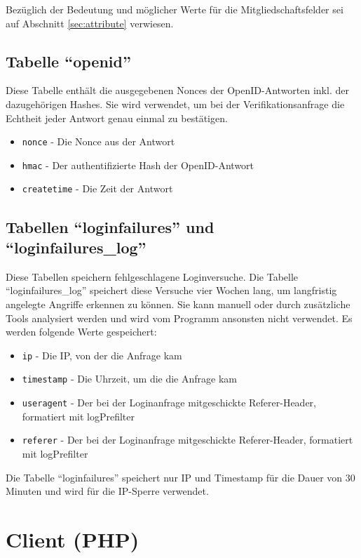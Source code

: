 \documentclass[parskip=half]{scrartcl}
\begin{document}
Bezüglich der Bedeutung und möglicher Werte für die Mitgliedschaftsfelder sei auf Abschnitt \ref{sec:attribute} verwiesen.

\subsection{Tabelle "`openid"'}
Diese Tabelle enthält die ausgegebenen Nonces der OpenID-Antworten inkl. der dazugehörigen Hashes.
Sie wird verwendet, um bei der Verifikationsanfrage die Echtheit jeder Antwort genau einmal zu bestätigen.
\begin{itemize}
	\item \texttt{nonce} - Die Nonce aus der Antwort
	\item \texttt{hmac} - Der authentifizierte Hash der OpenID-Antwort
	\item \texttt{createtime} - Die Zeit der Antwort
\end{itemize}

\subsection{Tabellen "`loginfailures"' und "`loginfailures\_log"'}
Diese Tabellen speichern fehlgeschlagene Loginversuche.
Die Tabelle "`loginfailures\_log"' speichert diese Versuche vier Wochen lang, um langfristig angelegte Angriffe erkennen zu können.
Sie kann manuell oder durch zusätzliche Tools analysiert werden und wird vom Programm ansonsten nicht verwendet.
Es werden folgende Werte gespeichert:
\begin{itemize}
	\item \texttt{ip} - Die IP, von der die Anfrage kam
	\item \texttt{timestamp} - Die Uhrzeit, um die die Anfrage kam
	\item \texttt{useragent} - Der bei der Loginanfrage mitgeschickte Referer-Header, formatiert mit logPrefilter
	\item \texttt{referer} - Der bei der Loginanfrage mitgeschickte Referer-Header, formatiert mit logPrefilter
\end{itemize}

Die Tabelle "`loginfailures"' speichert nur IP und Timestamp für die Dauer von 30 Minuten und wird für die IP-Sperre verwendet.

\section{Client (PHP)}

\end{document}
